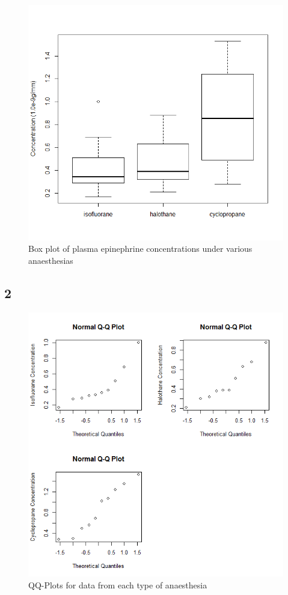 \documentclass{article}
\begin{document}
    \begin{figure}[!htb]
    \centering
      \includegraphics[scale=0.3]{../results/4_1.png}
      \caption{Box plot of plasma epinephrine concentrations under various anaesthesias}
      \label{fig:dbox}
    \end{figure}
    
    \subsection*{2}
    
    \begin{figure}[!htb]
    \centering
      \includegraphics[scale=0.4]{../results/4_2.png}
      \caption{QQ-Plots for data from each type of anaesthesia}
      \label{fig:qq dog}
    \end{figure}
    
\end{document}
